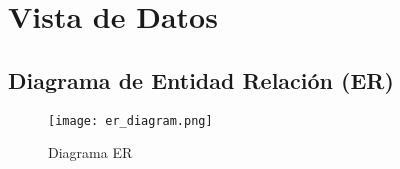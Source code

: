 \section{Vista de Datos} \label{vistaDatos}

\subsection{Diagrama de Entidad Relación (ER)}
\begin{figure}[H]
    \texttt{[image: er\_diagram.png]}
    \caption{Diagrama ER}
    \label{fig:er_diagram}
    \centering
\end{figure}